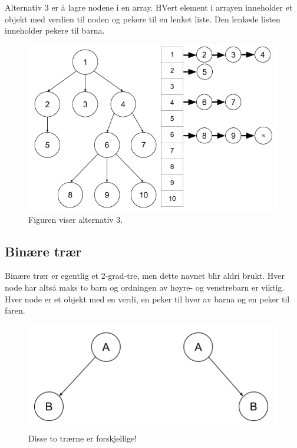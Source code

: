 \noindent Alternativ 3 er å lagre nodene i en array. HVert element i arrayen inneholder et objekt med verdien til noden og pekere til en lenket liste. Den lenkede listen inneholder pekere til barna.

\begin{figure}[H]
\includegraphics[scale=0.6]{images/alernativ3}
\centering %
\caption{Figuren viser alternativ 3.}
\label{fig:alternativ3}
\end{figure}

\subsection{Binære trær}
Binære trær er egentlig et 2-grad-tre, men dette navnet blir aldri brukt. Hver node har altså maks to barn og ordningen av høyre- og venstrebarn er viktig. Hver node er et objekt med en verdi, en peker til hver av barna og en peker til faren.

\begin{figure}[H]
\includegraphics[scale=0.6]{images/binaeretraer}
\centering %
\caption{Disse to trærne er forskjellige!}
\label{fig:binaeretraer}
\end{figure}

